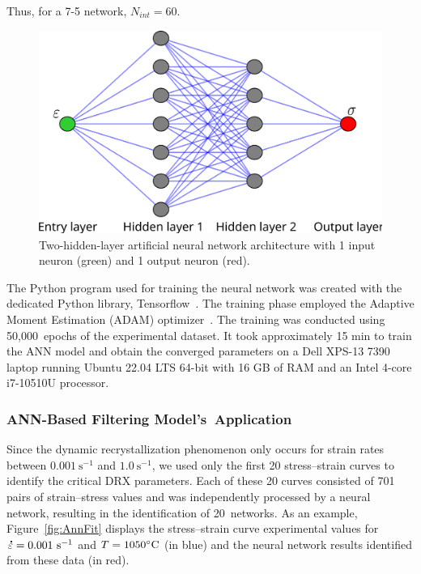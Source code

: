 \documentclass[metals,article,accept,pdftex,moreauthors]{Definitions/mdpi}
\DeclareRobustCommand{\mdot}[1]{\accentset{\mbox{\bfseries .}}{#1}}
\DeclareRobustCommand{\ps}{\text{s}^{-1}}
\begin{document}
Thus, for a 7-5 network, $N_{int}=60$.
\begin{figure}[H]
\centering
\includegraphics[width=0.7\columnwidth]{Figures/ANN-7-5}
\caption{Two-hidden-layer artificial neural network architecture with 1 input neuron (green) and 1 output neuron (red).}
\label{fig:ANN-7-5}
\end{figure}
The Python program used for training the neural network was created with the dedicated Python library, Tensorflow~\cite{Abadi-2016}.
The training phase employed the Adaptive Moment Estimation (ADAM) optimizer~\cite{Kingma-2015}.
The training was conducted using 50,000~epochs of the experimental dataset.
It took approximately 15 min to train the ANN model and obtain the converged parameters on a Dell XPS-13 7390 %
 laptop running Ubuntu 22.04 LTS 64-bit with 16 GB of RAM and an Intel 4-core i7-10510U processor.

\subsubsection{ANN-Based Filtering Model's~Application} \label{subsec:ANNapplication}

Since the dynamic recrystallization phenomenon only occurs for strain rates between $0.001~\ps$ and $1.0~\ps$, we used only the first 20 stress--strain curves to identify the critical DRX parameters.
Each of these 20 curves consisted of 701 pairs of strain--stress values and was independently processed by a neural network, resulting in the identification of 20~networks.
As an example, Figure~\ref{fig:AnnFit} displays the stress--strain curve experimental values for $\mdot\varepsilon=0.001~\ps$ and $T=1050\celsius$ (in blue) and the neural network results identified from these data (in red).
\end{document}
